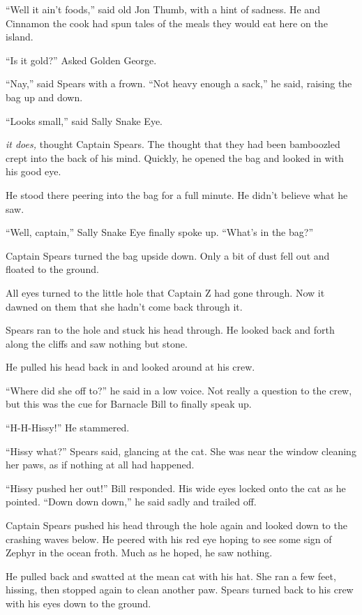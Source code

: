 \documentclass[12pt]{extbook}
\begin{document}
  \enquote{Well it ain't foods,} said old Jon Thumb, with a hint of
  sadness. He and Cinnamon the cook had spun tales of the meals they would
  eat here on the island.
  
  \enquote{Is it gold?} Asked Golden George.
  
  \enquote{Nay,} said Spears with a frown. \enquote{Not heavy enough a
  sack,} he said, raising the bag up and down.
  
  \enquote{Looks small,} said Sally Snake Eye.
  
  \emph{it does,} thought Captain Spears. The thought that they had been
  bamboozled crept into the back of his mind. Quickly, he opened the bag
  and looked in with his good eye.
  
  He stood there peering into the bag for a full minute. He didn't believe
  what he saw.
  
  \enquote{Well, captain,} Sally Snake Eye finally spoke up.
  \enquote{What's in the bag?}
  
  Captain Spears turned the bag upside down. Only a bit of dust fell out
  and floated to the ground.
  
  All eyes turned to the little hole that Captain Z had gone through. Now
  it dawned on them that she hadn't come back through it.
  
  Spears ran to the hole and stuck his head through. He looked back and
  forth along the cliffs and saw nothing but stone.
  
  He pulled his head back in and looked around at his crew.
  
  \enquote{Where did she off to?} he said in a low voice. Not really a
  question to the crew, but this was the cue for Barnacle Bill to finally
  speak up.
  
  \enquote{H-H-Hissy!} He stammered.
  
  \enquote{Hissy what?} Spears said, glancing at the cat. She was near the
  window cleaning her paws, as if nothing at all had happened.
  
  \enquote{Hissy pushed her out!} Bill responded. His wide eyes locked
  onto the cat as he pointed. \enquote{Down down down,} he said sadly and
  trailed off.
  
  Captain Spears pushed his head through the hole again and looked down to
  the crashing waves below. He peered with his red eye hoping to see some
  sign of Zephyr in the ocean froth. Much as he hoped, he saw nothing.
  
  He pulled back and swatted at the mean cat with his hat. She ran a few
  feet, hissing, then stopped again to clean another paw. Spears turned
  back to his crew with his eyes down to the ground.
  
\end{document}
